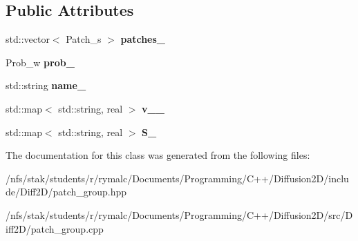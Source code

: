 \subsection*{Public Attributes}
\begin{DoxyCompactItemize}
\item 
\hypertarget{classPatch__Group_a637b27a0562076f78bf9b0698ac3609e}{
std::vector$<$ Patch\_\-s $>$ {\bfseries patches\_\-}}
\label{classPatch__Group_a637b27a0562076f78bf9b0698ac3609e}

\item 
\hypertarget{classPatch__Group_ac8d91a179d394f1d3d355d82ceb2dd2e}{
Prob\_\-w {\bfseries prob\_\-}}
\label{classPatch__Group_ac8d91a179d394f1d3d355d82ceb2dd2e}

\item 
\hypertarget{classPatch__Group_ac28afa5068ea65b91ce4d708f63c5a3a}{
std::string {\bfseries name\_\-}}
\label{classPatch__Group_ac28afa5068ea65b91ce4d708f63c5a3a}

\item 
\hypertarget{classPatch__Group_ae080e43ddd30ced473794b12a1cb3ccf}{
std::map$<$ std::string, real $>$ {\bfseries v\_\_\-}}
\label{classPatch__Group_ae080e43ddd30ced473794b12a1cb3ccf}

\item 
\hypertarget{classPatch__Group_aaad946bd88382b1e2e30cd1278632ace}{
std::map$<$ std::string, real $>$ {\bfseries S\_\-}}
\label{classPatch__Group_aaad946bd88382b1e2e30cd1278632ace}

\end{DoxyCompactItemize}


The documentation for this class was generated from the following files:\begin{DoxyCompactItemize}
\item 
/nfs/stak/students/r/rymalc/Documents/Programming/C++/Diffusion2D/include/Diff2D/patch\_\-group.hpp\item 
/nfs/stak/students/r/rymalc/Documents/Programming/C++/Diffusion2D/src/Diff2D/patch\_\-group.cpp\end{DoxyCompactItemize}
